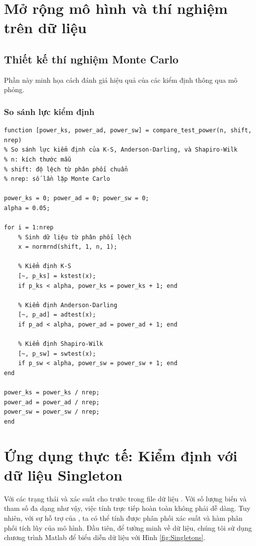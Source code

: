 \section{Mở rộng mô hình và thí nghiệm trên dữ liệu}

\subsection{Thiết kế thí nghiệm Monte Carlo}
Phần này minh họa cách đánh giá hiệu quả của các kiểm định thông qua mô phỏng.

\subsubsection*{So sánh lực kiểm định}
\begin{matlab}
\begin{lstlisting}
function [power_ks, power_ad, power_sw] = compare_test_power(n, shift, nrep)
% So sánh lực kiểm định của K-S, Anderson-Darling, và Shapiro-Wilk
% n: kích thước mẫu
% shift: độ lệch từ phân phối chuẩn
% nrep: số lần lặp Monte Carlo

power_ks = 0; power_ad = 0; power_sw = 0;
alpha = 0.05;

for i = 1:nrep
    % Sinh dữ liệu từ phân phối lệch
    x = normrnd(shift, 1, n, 1);
    
    % Kiểm định K-S
    [~, p_ks] = kstest(x);
    if p_ks < alpha, power_ks = power_ks + 1; end
    
    % Kiểm định Anderson-Darling  
    [~, p_ad] = adtest(x);
    if p_ad < alpha, power_ad = power_ad + 1; end
    
    % Kiểm định Shapiro-Wilk
    [~, p_sw] = swtest(x);
    if p_sw < alpha, power_sw = power_sw + 1; end
end

power_ks = power_ks / nrep;
power_ad = power_ad / nrep;
power_sw = power_sw / nrep;
end
\end{lstlisting}
\end{matlab}

\section{Ứng dụng thực tế: Kiểm định với dữ liệu Singleton}

Với các trạng thái và xác suất cho trước trong file dữ liệu . Với số lượng biến và tham số đa dạng như vậy, việc tính trực tiếp hoàn toàn không phải dễ dàng. Tuy nhiên, với sự hỗ trợ của , ta có thể tính được phân phối xác suất và hàm phân phối tích lũy của mô hình. Đầu tiên, để tường minh về dữ liệu, chúng tôi sử dụng chương trình Matlab để biểu diễn dữ liệu với Hình \ref{fig:Singletons}.

